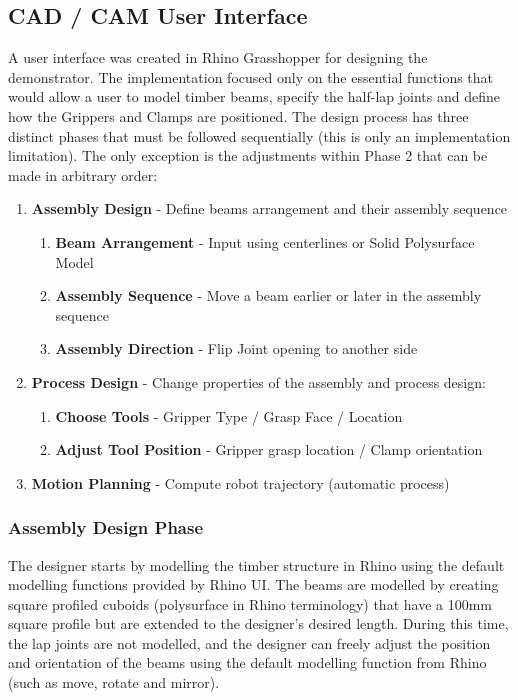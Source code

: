 \subsection{CAD / CAM User Interface}
\label{subsection:exploration-2-cad-cam-user-interface}

A user interface was created in Rhino Grasshopper for designing the demonstrator. The implementation focused only on the essential functions that would allow a user to model timber beams, specify the half-lap joints and define how the Grippers and Clamps are positioned. The design process has three distinct phases that must be followed sequentially (this is only an implementation limitation). The only exception is the adjustments within Phase 2 that can be made in arbitrary order:

\begin{enumerate}[nosep]
    \item \textbf{Assembly Design} - Define beams arrangement and their assembly sequence
    \begin{enumerate}
        \item \textbf{Beam Arrangement} - Input using centerlines or Solid Polysurface Model
        \item \textbf{Assembly Sequence} - Move a beam earlier or later in the assembly sequence
        \item \textbf{Assembly Direction} - Flip Joint opening to another side
    \end{enumerate}
    \item \textbf{Process Design} - Change properties of the assembly and process design:
    \begin{enumerate}
        \item \textbf{Choose Tools} - Gripper Type / Grasp Face / Location
        \item \textbf{Adjust Tool Position} - Gripper grasp location / Clamp orientation
    \end{enumerate}
    \item \textbf{Motion Planning} - Compute robot trajectory (automatic process)
\end{enumerate}

\subsubsection{Assembly Design Phase}
\label{subsubsection:exploration-2-assembly-design-phase}

The designer starts by modelling the timber structure in Rhino using the default modelling functions provided by Rhino UI. The beams are modelled by creating square profiled cuboids (polysurface in Rhino terminology) that have a 100mm square profile but are extended to the designer’s desired length. During this time, the lap joints are not modelled, and the designer can freely adjust the position and orientation of the beams using the default modelling function from Rhino (such as move, rotate and mirror). 

